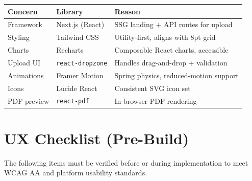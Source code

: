\documentclass[12pt,a4paper]{article}
\begin{document}
\begin{center}
\begin{tabular}{lll}
\toprule
\textbf{Concern}       & \textbf{Library}            & \textbf{Reason} \\
\midrule
Framework              & Next.js (React)             & SSG landing + API routes for upload \\
Styling                & Tailwind CSS                & Utility-first, aligns with 8pt grid \\
Charts                 & Recharts                    & Composable React charts, accessible \\
Upload UI              & \texttt{react-dropzone}     & Handles drag-and-drop + validation \\
Animations             & Framer Motion               & Spring physics, reduced-motion support \\
Icons                  & Lucide React                & Consistent SVG icon set \\
PDF preview            & \texttt{react-pdf}          & In-browser PDF rendering \\
\bottomrule
\end{tabular}
\end{center}

\section{UX Checklist (Pre-Build)}

\begin{tcolorbox}[warnbox]
  The following items must be verified before or during implementation to meet
  WCAG AA and platform usability standards.
\end{tcolorbox}
\end{document}
